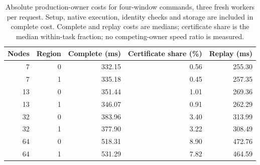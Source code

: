 \begin{table}[!htbp]
\centering\small
\caption{Absolute production-owner costs for four-window commands, three fresh workers per request. Setup, native execution, identity checks and storage are included in complete cost. Complete and replay costs are medians; certificate share is the median within-task fraction; no competing-owner speed ratio is measured.}
\label{tab:windowowner}
\begin{tabular}{rrrrr}\toprule
Nodes & Region & Complete (ms) & Certificate share (\%) & Replay (ms)\\\midrule
7 & 0 & 332.15 & 0.56 & 255.30\\
7 & 1 & 335.18 & 0.45 & 257.35\\
13 & 0 & 351.44 & 1.01 & 269.36\\
13 & 1 & 346.07 & 0.91 & 262.29\\
32 & 0 & 383.96 & 3.40 & 313.99\\
32 & 1 & 377.90 & 3.22 & 308.49\\
64 & 0 & 518.31 & 8.90 & 472.76\\
64 & 1 & 531.29 & 7.82 & 464.59\\
\bottomrule\end{tabular}
\end{table}
